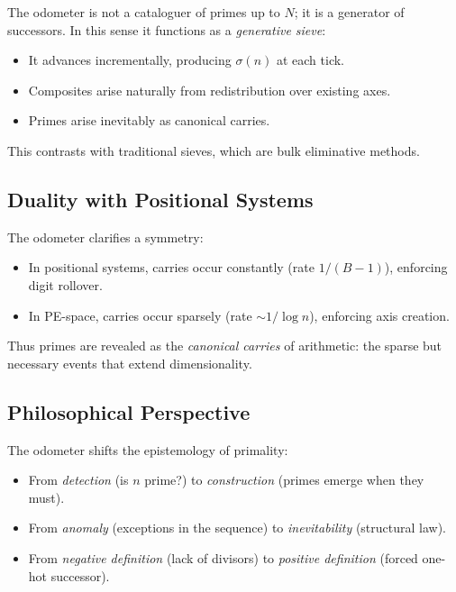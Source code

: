\documentclass[12pt]{article}
\theoremstyle{definition}
\theoremstyle{remark}
\begin{document}
The odometer is not a cataloguer of primes up to $N$; it is a generator of successors. In this sense
it functions as a \emph{generative sieve}:

\begin{itemize}
  \item It advances incrementally, producing $\sigma(n)$ at each tick.
  \item Composites arise naturally from redistribution over existing axes.
  \item Primes arise inevitably as canonical carries.
\end{itemize}

This contrasts with traditional sieves, which are bulk eliminative methods.

\subsection{Duality with Positional Systems}

The odometer clarifies a symmetry:

\begin{itemize}
  \item In positional systems, carries occur constantly (rate $1/(B-1)$), enforcing digit rollover.
  \item In PE-space, carries occur sparsely (rate $\sim 1/\log n$), enforcing axis creation.
\end{itemize}

Thus primes are revealed as the \emph{canonical carries} of arithmetic: the sparse but necessary
events that extend dimensionality.

\subsection{Philosophical Perspective}

The odometer shifts the epistemology of primality:

\begin{itemize}
  \item From \emph{detection} (is $n$ prime?) to \emph{construction} (primes emerge when they must).
  \item From \emph{anomaly} (exceptions in the sequence) to \emph{inevitability} (structural law).
  \item From \emph{negative definition} (lack of divisors) to \emph{positive definition}
        (forced one-hot successor).
\end{itemize}
\end{document}
